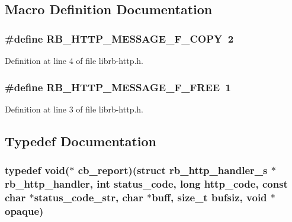 \subsection{Macro Definition Documentation}
\hypertarget{librb-http_8h_a0ffdecd586e5dc8f1eeede6bac9bc19f}{
\subsubsection[{R\-B\-\_\-\-H\-T\-T\-P\-\_\-\-M\-E\-S\-S\-A\-G\-E\-\_\-\-F\-\_\-\-C\-O\-P\-Y}]{\setlength{\rightskip}{0pt plus 5cm}\#define R\-B\-\_\-\-H\-T\-T\-P\-\_\-\-M\-E\-S\-S\-A\-G\-E\-\_\-\-F\-\_\-\-C\-O\-P\-Y~2}}\label{librb-http_8h_a0ffdecd586e5dc8f1eeede6bac9bc19f}


Definition at line 4 of file librb-\/http.\-h.

\hypertarget{librb-http_8h_aef79f44f520e54cbedce1068fe324720}{
\subsubsection[{R\-B\-\_\-\-H\-T\-T\-P\-\_\-\-M\-E\-S\-S\-A\-G\-E\-\_\-\-F\-\_\-\-F\-R\-E\-E}]{\setlength{\rightskip}{0pt plus 5cm}\#define R\-B\-\_\-\-H\-T\-T\-P\-\_\-\-M\-E\-S\-S\-A\-G\-E\-\_\-\-F\-\_\-\-F\-R\-E\-E~1}}\label{librb-http_8h_aef79f44f520e54cbedce1068fe324720}


Definition at line 3 of file librb-\/http.\-h.



\subsection{Typedef Documentation}
\hypertarget{librb-http_8h_abcf27caf85ec3ac2b11d1b89aed63966}{
\subsubsection[{cb\-\_\-report}]{\setlength{\rightskip}{0pt plus 5cm}typedef void($\ast$ cb\-\_\-report)(struct {\bf rb\-\_\-http\-\_\-handler\-\_\-s} $\ast$rb\-\_\-http\-\_\-handler, int status\-\_\-code, long http\-\_\-code, const char $\ast$status\-\_\-code\-\_\-str, char $\ast$buff, size\-\_\-t bufsiz, void $\ast$opaque)}}\label{librb-http_8h_abcf27caf85ec3ac2b11d1b89aed63966}


